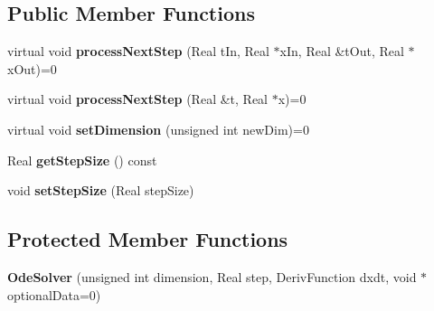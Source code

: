 \subsection*{Public Member Functions}
\begin{DoxyCompactItemize}
\item 
\hypertarget{class_rigid2_d_1_1_ode_solver_a65fafafc1bc529bd3e76bed1511517c7}{
virtual void {\bfseries processNextStep} (Real tIn, Real $\ast$xIn, Real \&tOut, Real $\ast$xOut)=0}
\label{class_rigid2_d_1_1_ode_solver_a65fafafc1bc529bd3e76bed1511517c7}

\item 
\hypertarget{class_rigid2_d_1_1_ode_solver_a8272aadd5ef0b8bfaaead91f28e9bed6}{
virtual void {\bfseries processNextStep} (Real \&t, Real $\ast$x)=0}
\label{class_rigid2_d_1_1_ode_solver_a8272aadd5ef0b8bfaaead91f28e9bed6}

\item 
\hypertarget{class_rigid2_d_1_1_ode_solver_ab027f9ac8e7b3964ae6dde9d6cb31080}{
virtual void {\bfseries setDimension} (unsigned int newDim)=0}
\label{class_rigid2_d_1_1_ode_solver_ab027f9ac8e7b3964ae6dde9d6cb31080}

\item 
\hypertarget{class_rigid2_d_1_1_ode_solver_adf2340b12b0e953b0f7d493a62082544}{
Real {\bfseries getStepSize} () const }
\label{class_rigid2_d_1_1_ode_solver_adf2340b12b0e953b0f7d493a62082544}

\item 
\hypertarget{class_rigid2_d_1_1_ode_solver_a7276816b38e0c24a6cd325f21347d957}{
void {\bfseries setStepSize} (Real stepSize)}
\label{class_rigid2_d_1_1_ode_solver_a7276816b38e0c24a6cd325f21347d957}

\end{DoxyCompactItemize}
\subsection*{Protected Member Functions}
\begin{DoxyCompactItemize}
\item 
\hypertarget{class_rigid2_d_1_1_ode_solver_acd5eb1eb95fc0bbbee089cbe5f8ece93}{
{\bfseries OdeSolver} (unsigned int dimension, Real step, DerivFunction dxdt, void $\ast$optionalData=0)}
\label{class_rigid2_d_1_1_ode_solver_acd5eb1eb95fc0bbbee089cbe5f8ece93}

\end{DoxyCompactItemize}
